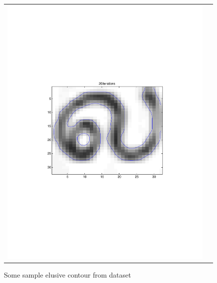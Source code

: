 \begin{center}
\begin{figure}
\begin{tabular}{ cc }
\includegraphics[scale=0.4]{./img/la} \\
\end{tabular}


  \caption{Some sample elusive contour from dataset}\label{ESAM}
\end{figure}
\end{center}
